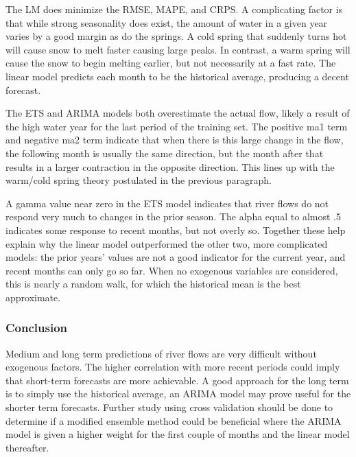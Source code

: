 \documentclass[
  letterpaper,
  DIV=11,
  numbers=noendperiod]{scrartcl}
\begin{document}
The LM does minimize the RMSE, MAPE, and CRPS. A complicating factor is
that while strong seasonality does exist, the amount of water in a given
year varies by a good margin as do the springs. A cold spring that
suddenly turns hot will cause snow to melt faster causing large peaks.
In contrast, a warm spring will cause the snow to begin melting earlier,
but not necessarily at a fast rate. The linear model predicts each month
to be the historical average, producing a decent forecast.

The ETS and ARIMA models both overestimate the actual flow, likely a
result of the high water year for the last period of the training set.
The positive ma1 term and negative ma2 term indicate that when there is
this large change in the flow, the following month is usually the same
direction, but the month after that results in a larger contraction in
the opposite direction. This lines up with the warm/cold spring theory
postulated in the previous paragraph.

A gamma value near zero in the ETS model indicates that river flows do
not respond very much to changes in the prior season. The alpha equal to
almost .5 indicates some response to recent months, but not overly so.
Together these help explain why the linear model outperformed the other
two, more complicated models: the prior years' values are not a good
indicator for the current year, and recent months can only go so far.
When no exogenous variables are considered, this is nearly a random
walk, for which the historical mean is the best approximate.

\hypertarget{conclusion}{%
\subsubsection{Conclusion}\label{conclusion}}

Medium and long term predictions of river flows are very difficult
without exogenous factors. The higher correlation with more recent
periods could imply that short-term forecasts are more achievable. A
good approach for the long term is to simply use the historical average,
an ARIMA model may prove useful for the shorter term forecasts. Further
study using cross validation should be done to determine if a modified
ensemble method could be beneficial where the ARIMA model is given a
higher weight for the first couple of months and the linear model
thereafter.
\end{document}
